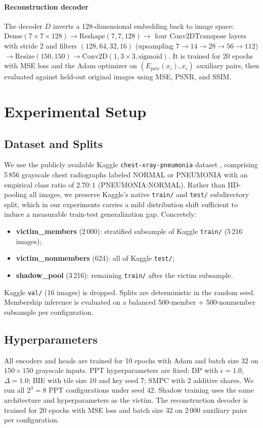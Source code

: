 \documentclass[conference]{IEEEtran}
\begin{document}
\paragraph{Reconstruction decoder} The decoder $D$ inverts a 128-dimensional embedding back to image space: $\mathrm{Dense}(7{\times}7{\times}128) \to \mathrm{Reshape}(7,7,128) \to$ four $\mathrm{Conv2DTranspose}$ layers with stride $2$ and filters $(128, 64, 32, 16)$ (upsampling $7{\to}14{\to}28{\to}56{\to}112$) $\to \mathrm{Resize}(150,150) \to \mathrm{Conv2D}(1, 3{\times}3, \mathrm{sigmoid})$. It is trained for 20 epochs with MSE loss and the Adam optimizer on $(E_{\mathrm{priv}}(x_i), x_i)$ auxiliary pairs, then evaluated against held-out original images using MSE, PSNR, and SSIM.

\section{Experimental Setup}
\label{sec:setup}

\subsection{Dataset and Splits}
We use the publicly available Kaggle \texttt{chest-xray-pneumonia} dataset \cite{mooney}, comprising 5\,856 grayscale chest radiographs labeled NORMAL or PNEUMONIA with an empirical class ratio of $2.70{:}1$ (PNEUMONIA:NORMAL). Rather than IID-pooling all images, we preserve Kaggle's native \texttt{train/} and \texttt{test/} subdirectory split, which in our experiments carries a mild distribution shift sufficient to induce a measurable train-test generalization gap. Concretely:
\begin{itemize}
  \item \textbf{victim\_members} (2\,000): stratified subsample of Kaggle \texttt{train/} (5\,216 images);
  \item \textbf{victim\_nonmembers} (624): all of Kaggle \texttt{test/};
  \item \textbf{shadow\_pool} (3\,216): remaining \texttt{train/} after the victim subsample.
\end{itemize}
Kaggle \texttt{val/} (16 images) is dropped. Splits are deterministic in the random seed. Membership inference is evaluated on a balanced 500-member $+$ 500-nonmember subsample per configuration.

\subsection{Hyperparameters}
All encoders and heads are trained for 10 epochs with Adam and batch size 32 on $150{\times}150$ grayscale inputs. PPT hyperparameters are fixed: DP with $\epsilon=1.0$, $\Delta=1.0$; BIE with tile size $10$ and key seed $7$; SMPC with $2$ additive shares. We run all $2^{3}=8$ PPT configurations under seed $42$. Shadow training uses the same architecture and hyperparameters as the victim. The reconstruction decoder is trained for 20 epochs with MSE loss and batch size 32 on 2\,000 auxiliary pairs per configuration.
\end{document}
